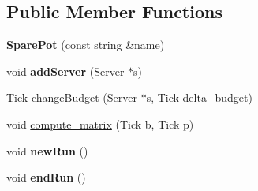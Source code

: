 \subsection*{Public Member Functions}
\begin{DoxyCompactItemize}
\item 
{\bfseries Spare\+Pot} (const string \&name)\hypertarget{classRTSim_1_1SparePot_a0bafc3b270453c42501d34b65e2f40a3}{}\label{classRTSim_1_1SparePot_a0bafc3b270453c42501d34b65e2f40a3}

\item 
void {\bfseries add\+Server} (\hyperlink{classRTSim_1_1Server}{Server} $\ast$s)\hypertarget{classRTSim_1_1SparePot_a27add401fc76c4de669132c3872129e7}{}\label{classRTSim_1_1SparePot_a27add401fc76c4de669132c3872129e7}

\item 
Tick \hyperlink{classRTSim_1_1SparePot_a90d4212ce2627ee8a16a3317e395251b}{change\+Budget} (\hyperlink{classRTSim_1_1Server}{Server} $\ast$s, Tick delta\+\_\+budget)
\item 
void \hyperlink{classRTSim_1_1SparePot_a9ac3e7da1b8c19b393b5288fff0aee41}{compute\+\_\+matrix} (Tick b, Tick p)
\item 
void {\bfseries new\+Run} ()\hypertarget{classRTSim_1_1SparePot_a249bba5ac479f888230d5c8a6fe74288}{}\label{classRTSim_1_1SparePot_a249bba5ac479f888230d5c8a6fe74288}

\item 
void {\bfseries end\+Run} ()\hypertarget{classRTSim_1_1SparePot_a992b72fd24c7258010a92ab460960058}{}\label{classRTSim_1_1SparePot_a992b72fd24c7258010a92ab460960058}

\end{DoxyCompactItemize}
